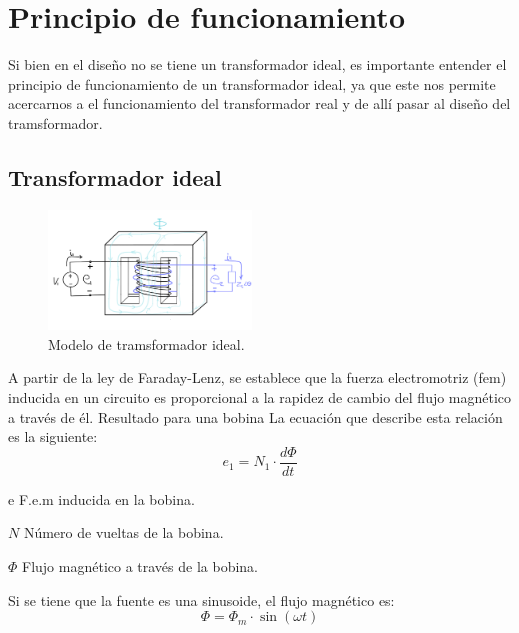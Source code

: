 \section{Principio de funcionamiento} 
Si bien en el diseño no se tiene un transformador ideal, es importante entender el principio de funcionamiento de un transformador ideal, ya que este nos permite acercarnos a el funcionamiento del transformador real y de allí pasar al diseño del tramsformador.

\subsection{Transformador ideal}

\begin{figure}[ht!]
    \centering
    \includegraphics[width=0.48\textwidth]{fot/T4.png}
    \caption{Modelo de tramsformador ideal.}
    \label{fig:T4}
\end{figure}

A partir de la ley de Faraday-Lenz, se establece que la fuerza electromotriz (fem) inducida en un circuito es proporcional a la rapidez de cambio del flujo magnético a través de él. Resultado para una bobina La ecuación que describe esta relación es la siguiente:
\begin{equation}
    \label{eqn1}
    e_1 = N_1 \cdot \frac{d\Phi}{dt}
\end{equation}


\begin{IEEEdescription}[\IEEEsetlabelwidth{$V_1,V_2,$}]
\item[e] F.e.m inducida en la bobina.
\mbox{}
\item[$N$] Número de vueltas de la bobina.
\item[$\Phi$] Flujo magnético a través de la bobina.
\end{IEEEdescription}

\vspace{0.5cm}
Si se tiene que la fuente es una sinusoide, el flujo magnético es:
\begin{equation}
    \Phi = \Phi_m \cdot \sin(\omega t)
\end{equation}

